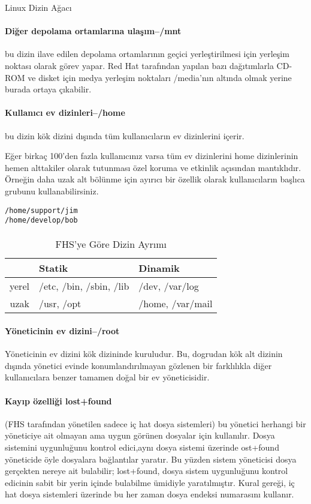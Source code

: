 \begin{section}{Linux Dizin Ağacı}
\paragraph{Diğer depolama ortamlarına ulaşım--/mnt}{bu dizin ilave edilen depolama ortamlarının geçici yerleştirilmesi için yerleşim noktası olarak görev yapar. Red Hat tarafından yapılan bazı dağıtımlarla CD-ROM ve disket için medya yerleşim noktaları /media’nın altında olmak yerine burada ortaya çıkabilir.}

\paragraph{Kullanıcı ev dizinleri--/home}{ bu dizin kök dizini dışında tüm kullanıcıların ev dizinlerini içerir.}

Eğer birkaç 100’den fazla kullanıcınız varsa tüm ev dizinlerini home dizinlerinin hemen alttakiler olarak tutunması özel koruma ve etkinlik açısından mantıklıdır. Örneğin daha uzak alt bölünme için ayırıcı bir özellik olarak kullanıcıların başlıca grubunu kullanabilirsiniz.
\begin{verbatim}
/home/support/jim
/home/develop/bob
\end{verbatim}
\paragraph{}{
\begin {table}[H]
\caption {FHS'ye Göre Dizin Ayrımı} \label{tab:title} 
\begin{tabular}{r l l}
\hline
{} & Statik& Dinamik\\
\hline
yerel & /etc, /bin, /sbin, /lib & /dev, /var/log\\
uzak & /usr, /opt & /home, /var/mail\\
\hline
\end{tabular}
\end {table}}

\paragraph{Yöneticinin ev dizini--/root}{Yöneticinin ev dizini kök dizininde kuruludur. Bu, dogrudan kök alt dizinin dışında yönetici evinde konumlandırılmayan gözlenen bir farklılıkla diğer kullanıcılara benzer tamamen doğal bir ev yöneticisidir.}

\paragraph{Kayıp özelliği lost+found}{ (FHS tarafından yönetilen sadece iç hat dosya sistemleri) bu yönetici herhangi bir yöneticiye ait olmayan ama uygun görünen dosyalar için kullanılır. Dosya sistemini uygunluğunu kontrol edici,aynı dosya sistemi üzerinde ost+found yöneticide öyle dosyalara bağlantılar yaratır. Bu yüzden sistem yöneticisi dosya gerçekten nereye ait bulabilir; lost+found, dosya sistem uygunluğunu kontrol edicinin sabit bir yerin içinde bulabilme ümidiyle yaratılmıştır. Kural gereği, iç hat dosya sistemleri üzerinde bu her zaman dosya endeksi numarasını kullanır.}


\end{section}
